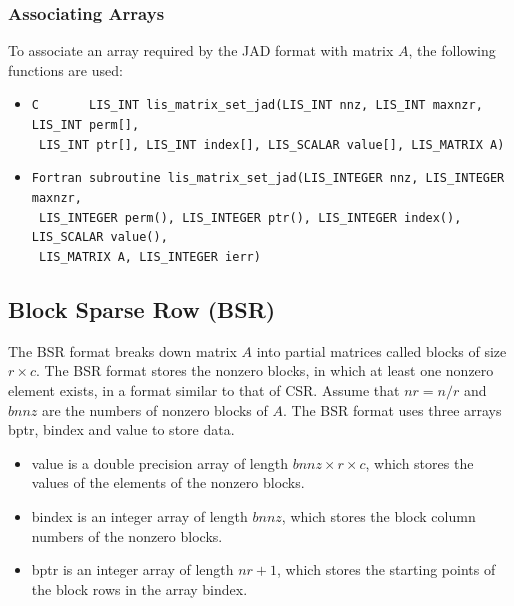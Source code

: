 \documentclass[a4paper]{article}
\begin{document}
\subsubsection{Associating Arrays}
To associate an array required by the JAD format with matrix $A$, the following functions are used:
\begin{itemize}
\item \verb|C       LIS_INT lis_matrix_set_jad(LIS_INT nnz, LIS_INT maxnzr, LIS_INT perm[],|\\
      \verb| LIS_INT ptr[], LIS_INT index[], LIS_SCALAR value[], LIS_MATRIX A)|
\item \verb|Fortran subroutine lis_matrix_set_jad(LIS_INTEGER nnz, LIS_INTEGER maxnzr,|\\
      \verb| LIS_INTEGER perm(), LIS_INTEGER ptr(), LIS_INTEGER index(), LIS_SCALAR value(),|\\
      \verb| LIS_MATRIX A, LIS_INTEGER ierr)|
\end{itemize}

\newpage
\subsection{Block Sparse Row (BSR)}
The BSR format breaks down matrix $A$ into partial matrices called blocks of size $r \times c$. 
The BSR format stores the nonzero blocks, in which at least one nonzero
element exists, in a format similar to that of CSR. 
Assume that $nr=n/r$ and $bnnz$ are the numbers of nonzero blocks of $A$. 
The BSR format uses three arrays {\ttfamily bptr}, {\ttfamily bindex} and {\ttfamily value} to store data.
\begin{itemize}
\item {\ttfamily value} is a double precision array of length
      $bnnz \times r \times c$, which stores the values of the elements of the nonzero blocks.
\item {\ttfamily bindex} is an integer array of length $bnnz$,
      which stores the block column numbers of the nonzero blocks.
\item {\ttfamily bptr} is an integer array of length $nr+1$,
      which stores the starting points of the block rows in the array {\ttfamily bindex}.
\end{itemize}
\end{document}
